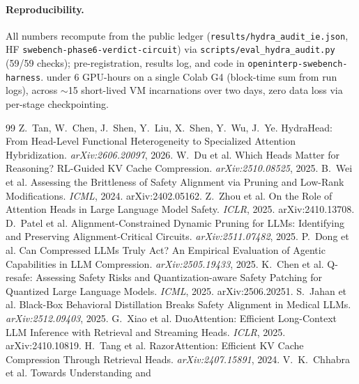 \documentclass[11pt]{article}
\begin{document}
\paragraph{Reproducibility.} All numbers recompute from the public ledger
(\texttt{results/hydra\_audit\_ie.json}, HF \texttt{swebench-phase6-verdict-circuit}) via
\texttt{scripts/eval\_hydra\_audit.py} (59/59 checks); pre-registration, results log, and code in
\texttt{openinterp-swebench-harness}. under 6 GPU-hours on a single Colab G4 (block-time sum from run logs), across $\sim$15
short-lived VM incarnations over two days, zero data loss via per-stage checkpointing.

\begin{thebibliography}{99}
\sloppy
{} Z.~Tan, W.~Chen, J.~Shen, Y.~Liu, X.~Shen, Y.~Wu, J.~Ye.
HydraHead: From Head-Level Functional Heterogeneity to Specialized Attention Hybridization.
\emph{arXiv:2606.20097}, 2026.
 W.~Du et al. Which Heads Matter for Reasoning? RL-Guided KV Cache
Compression. \emph{arXiv:2510.08525}, 2025.
 B.~Wei et al. Assessing the Brittleness of Safety Alignment
via Pruning and Low-Rank Modifications. \emph{ICML}, 2024. arXiv:2402.05162.
 Z.~Zhou et al. On the Role of Attention Heads in Large
Language Model Safety. \emph{ICLR}, 2025. arXiv:2410.13708.
 D.~Patel et al. Alignment-Constrained Dynamic Pruning for LLMs:
Identifying and Preserving Alignment-Critical Circuits. \emph{arXiv:2511.07482}, 2025.
 P.~Dong et al. Can Compressed LLMs Truly Act? An Empirical
Evaluation of Agentic Capabilities in LLM Compression. \emph{arXiv:2505.19433}, 2025.
 K.~Chen et al. Q-resafe: Assessing Safety Risks and
Quantization-aware Safety Patching for Quantized Large Language Models. \emph{ICML}, 2025.
arXiv:2506.20251.
 S.~Jahan et al. Black-Box Behavioral Distillation
Breaks Safety Alignment in Medical LLMs. \emph{arXiv:2512.09403}, 2025.
 G.~Xiao et al. DuoAttention: Efficient Long-Context LLM Inference
with Retrieval and Streaming Heads. \emph{ICLR}, 2025. arXiv:2410.10819.
 H.~Tang et al. RazorAttention: Efficient KV Cache Compression
Through Retrieval Heads. \emph{arXiv:2407.15891}, 2024.
 V.~K.~Chhabra et al. Towards Understanding and

\end{thebibliography}
\end{document}
